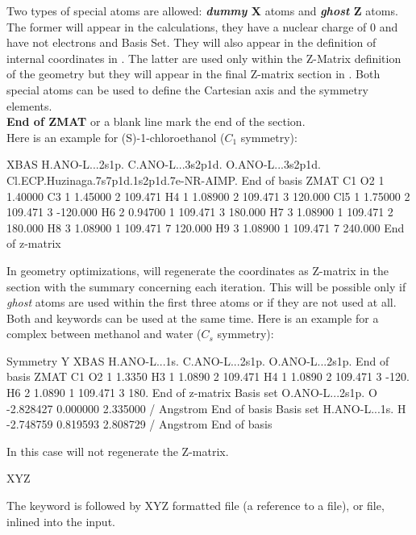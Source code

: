 \begin{keywordlist}
Two types of special atoms are allowed: {\bf \emph{dummy} X} atoms and
{\bf \emph{ghost} Z} atoms. The former will appear in the calculations,
they have a nuclear charge of 0 and have not electrons and Basis Set.
They will also appear in the definition of internal coordinates in .
The latter are used only within the Z-Matrix definition of the geometry but
they will appear in the final Z-matrix section in .
Both special atoms can be used to define the Cartesian axis and the symmetry elements.\\
{\bf End of ZMAT} or a blank line mark the end of the section.\\
Here is an example for (S)-1-chloroethanol ($C_1$ symmetry):
\begin{inputlisting}
XBAS
H.ANO-L...2s1p.
C.ANO-L...3s2p1d.
O.ANO-L...3s2p1d.
Cl.ECP.Huzinaga.7s7p1d.1s2p1d.7e-NR-AIMP.
End of basis
ZMAT
C1
O2	1   1.40000
C3	1   1.45000   2   109.471
H4	1   1.08900   2   109.471     3   120.000
Cl5	1   1.75000   2   109.471     3  -120.000
H6	2   0.94700   1   109.471     3   180.000
H7	3   1.08900   1   109.471     2   180.000
H8	3   1.08900   1   109.471     7   120.000
H9	3   1.08900   1   109.471     7   240.000
End of z-matrix
\end{inputlisting}
In geometry optimizations,  will regenerate the coordinates as
Z-matrix in the section with the summary concerning each iteration. This will
be possible only if \emph{ghost} atoms are used within the first three atoms or
if they are not used at all.\\
Both  and  keywords can be used at the same time. Here is an example
for a complex between methanol and water ($C_s$ symmetry):
\begin{inputlisting}
Symmetry
 Y
XBAS
H.ANO-L...1s.
C.ANO-L...2s1p.
O.ANO-L...2s1p.
End of basis
ZMAT
C1
O2  1 1.3350
H3  1 1.0890  2 109.471
H4  1 1.0890  2 109.471  3 -120.
H6  2 1.0890  1 109.471  3  180.
End of z-matrix
Basis set
O.ANO-L...2s1p.
 O    -2.828427     0.000000	 2.335000  / Angstrom
End of basis
Basis set
H.ANO-L...1s.
 H    -2.748759     0.819593	 2.808729  / Angstrom
End of basis
\end{inputlisting}
In this case  will not regenerate the Z-matrix.

\item[XYZ]

The keyword is followed by XYZ formatted file (a reference to a file),
or file, inlined into the input. 


\end{keywordlist}
